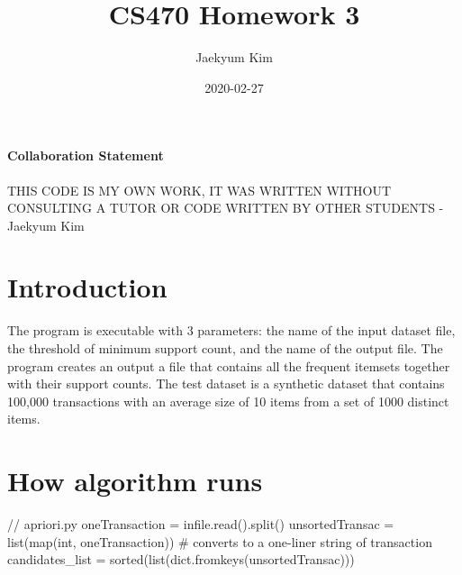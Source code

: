 \documentclass{article}
\title{CS470 Homework 3}
\date{2020-02-27}
\author{Jaekyum Kim}
\begin{document}
  \maketitle
  \newpage
\paragraph{Collaboration Statement}
THIS CODE IS MY OWN WORK, IT WAS WRITTEN WITHOUT CONSULTING A TUTOR OR CODE WRITTEN BY OTHER STUDENTS - Jaekyum Kim

\section{Introduction}
The program is executable with 3 parameters: the name of the input dataset file, the threshold of minimum support count, and the name of the output file. The program creates an output a file that contains all the frequent itemsets together with their support counts. The test dataset is a synthetic dataset that contains 100,000 transactions with an average size of 10 items from a set of 1000 distinct items. 

\section{How algorithm runs}
\begin{python}
// apriori.py
oneTransaction =  infile.read().split()
unsortedTransac = list(map(int, oneTransaction)) # converts to a one-liner string of transaction
candidates_list = sorted(list(dict.fromkeys(unsortedTransac)))
\end{python}
\end{document}

